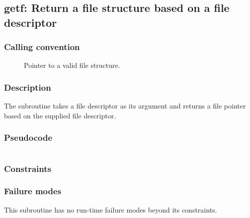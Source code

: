 \clearpage
{}
{}
\label{subr:getf}
\subsection*{getf: Return a file structure based on a file descriptor}

\subsubsection*{Calling convention}

\begin{description}
\item[] Pointer to a valid file structure.
\end{description}

\subsubsection*{Description}

The  subroutine takes a file descriptor as its
argument and returns a file pointer based on the supplied file
descriptor.

\subsubsection*{Pseudocode}

\begin{verbatim}
\end{verbatim}

\subsubsection*{Constraints}

\subsubsection*{Failure modes}

This subroutine has no run-time failure modes beyond its constraints.
